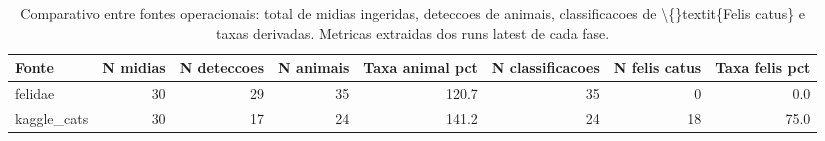 \begin{table}[!htb]
\centering
\caption{Comparativo entre fontes operacionais: total de midias ingeridas, deteccoes de animais, classificacoes de \textbackslash\{\}textit\{Felis catus\} e taxas derivadas. Metricas extraidas dos runs latest de cada fase.}
\label{tab:comparativo-fontes}
\begin{tabular}{lrrrrrrr}
\toprule
Fonte & N midias & N deteccoes & N animais & Taxa animal pct & N classificacoes & N felis catus & Taxa felis pct \\
\midrule
felidae & 30 & 29 & 35 & 120.7 & 35 & 0 & 0.0 \\
kaggle\_cats & 30 & 17 & 24 & 141.2 & 24 & 18 & 75.0 \\
\bottomrule
\end{tabular}
\end{table}
